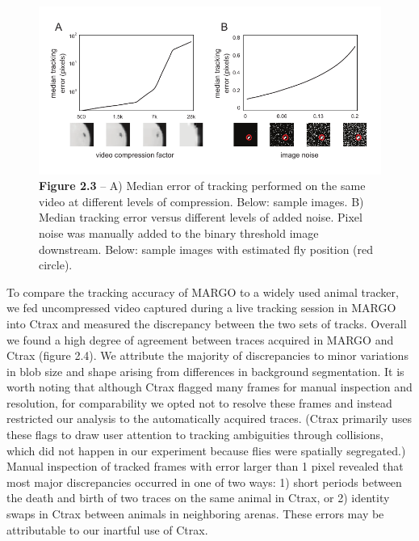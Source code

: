 \documentclass[12pt,letterpaper]{article}
\begin{document}
\begin{figure}[t!]
 \includegraphics[width=\textwidth]{../figures/chapter_2/fig_2-3.pdf}
 \vspace{.1in}
 \caption*{\textbf{Figure 2.3} -- A) Median error of tracking performed on the same video at different levels of compression. Below: sample images. B) Median tracking error versus different levels of added noise. Pixel noise was manually added to the binary threshold image downstream. Below: sample images with estimated fly position (red circle).}
\end{figure}

To compare the tracking accuracy of MARGO to a widely used animal tracker, we fed uncompressed video captured during a live tracking session in MARGO into Ctrax \cite{Branson_High_2009} and measured the discrepancy between the two sets of tracks. Overall we found a high degree of agreement between traces acquired in MARGO and Ctrax (figure 2.4). We attribute the majority of discrepancies to minor variations in blob size and shape arising from differences in background segmentation. It is worth noting that although Ctrax flagged many frames for manual inspection and resolution, for comparability we opted not to resolve these frames and instead restricted our analysis to the automatically acquired traces. (Ctrax primarily uses these flags to draw user attention to tracking ambiguities through collisions, which did not happen in our experiment because flies were spatially segregated.) Manual inspection of tracked frames with error larger than 1 pixel revealed that most major discrepancies occurred in one of two ways: 1) short periods between the death and birth of two traces on the same animal in Ctrax, or 2) identity swaps in Ctrax between animals in neighboring arenas. These errors may be attributable to our inartful use of Ctrax.
\end{document}
